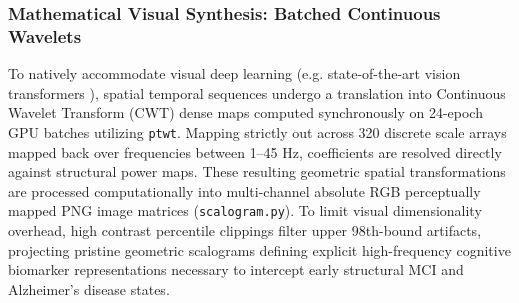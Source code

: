 \subsubsection{Mathematical Visual Synthesis: Batched Continuous Wavelets}
To natively accommodate visual deep learning (e.g. state-of-the-art vision transformers \cite{dosovitskiy2021vit}), spatial temporal sequences undergo a translation into Continuous Wavelet Transform (CWT) dense maps computed synchronously on 24-epoch GPU batches utilizing \texttt{ptwt}. 
Mapping strictly out across 320 discrete scale arrays mapped back over frequencies between 1--45 Hz, coefficients are resolved directly against structural power maps. 
These resulting geometric spatial transformations are processed computationally into multi-channel absolute RGB perceptually mapped PNG image matrices (\texttt{scalogram.py}). To limit visual dimensionality overhead, high contrast percentile clippings filter upper 98th-bound artifacts, projecting pristine geometric scalograms defining explicit high-frequency  cognitive biomarker representations necessary to intercept early structural MCI and Alzheimer's disease states.
